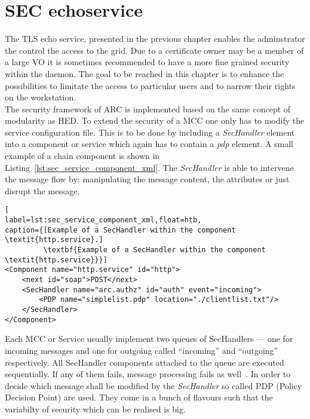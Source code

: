 \chapter{SEC echoservice}

The TLS echo service, presented in the previous chapter enables the adminstrator the control the access to the grid. Due to a certificate owner may be a member of a large VO it is sometimes recommended to have a more fine grained security within the daemon. 
The goal to be reached in this chapter is to enhance the possibilities to limitate the access to particular users and to narrow their rights on the workstation.\\


The security framework of ARC is implemented based on the same concept of modularity as HED. 
To extend the security of a MCC one only has to modify the service configuration file. This is to be done by including a \textit{SecHandler} element into a component or service which again has to contain a \textit{pdp} element. A small example of a chain component is shown in Listing~\ref{lst:sec_service_component_xml}. The \textit{SecHandler} is able to intervene the message flow
by: manipulating the message content, the attributes or just disrupt the message. 
\begin{lstlisting}[
label=lst:sec_service_component_xml,float=htb,
caption={[Example of a SecHandler within the component \textit{http.service}.]
         \textbf{Example of a SecHandler within the component \textit{http.service}}}]
<Component name="http.service" id="http">
	<next id="soap">POST</next>
	<SecHandler name="arc.authz" id="auth" event="incoming">
		<PDP name="simplelist.pdp" location="./clientlist.txt"/>
	</SecHandler>
</Component>
\end{lstlisting}
Each MCC or Service usually implement two queues of SecHandlers --- one for incoming messages and one for outgoing called
``incoming'' and ``outgoing'' respectively. All SecHandler components attached to the queue are executed sequentially. If any of them fails, message processing fails as well~\cite{QIANG_2008}.
In order to decide which message shall be modified by the \textit{SecHandler} so called PDP (Policy Decision Point) are used. They come in a bunch of flavours such that the variabilty of security which can be realised is big.\\


